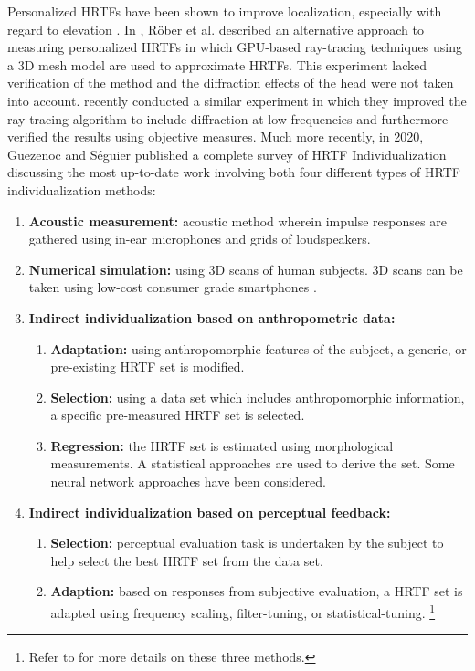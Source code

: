 Personalized HRTFs have been shown to improve localization, especially with regard to elevation \cite{kapralos2008virtual}. In \cite{rober2006hrtf}, Röber et al. described an alternative approach to measuring personalized HRTFs in which GPU-based ray-tracing techniques using a 3D mesh model are used to approximate HRTFs. This experiment lacked verification of the method and the diffraction effects of the head were not taken into account. \cite{sung2013individualized} recently conducted a similar experiment in which they improved the ray tracing algorithm to include diffraction at low frequencies and furthermore verified the results using objective measures. Much more recently, in 2020, Guezenoc and Séguier \cite{guezenoc2020hrtf} published a complete survey of HRTF Individualization discussing the most up-to-date work involving both four different types of HRTF individualization methods: 

\begin{enumerate}
    \item \textbf{Acoustic measurement:} acoustic method wherein impulse responses are gathered using in-ear microphones and grids of loudspeakers. 
    \item \textbf{Numerical simulation:} using 3D scans of human subjects. 3D scans can be taken using low-cost consumer grade smartphones \cite{kaneko2016deepearnet}. 
    \item \textbf{Indirect individualization based on anthropometric data:} 
    \begin{enumerate}
        \item \textbf{Adaptation:} using anthropomorphic features of the subject, a generic, or pre-existing HRTF set is modified. 
        \item \textbf{Selection:} using a data set which includes anthropomorphic information, a specific pre-measured HRTF set is selected. 
        \item \textbf{Regression:} the HRTF set is estimated using morphological measurements. A statistical approaches are used to derive the set. Some neural network approaches have been considered.
    \end{enumerate}
    \item \textbf{Indirect individualization based on perceptual feedback:} 
    \begin{enumerate}
        \item \textbf{Selection:} perceptual evaluation task is undertaken by the subject to help select the best HRTF set from the data set.
        \item \textbf{Adaption:} based on responses from subjective evaluation, a HRTF set is adapted using frequency scaling, filter-tuning, or statistical-tuning. \footnote{Refer to \cite{guezenoc2020hrtf} for more details on these three methods.} 
    \end{enumerate}
\end{enumerate}

